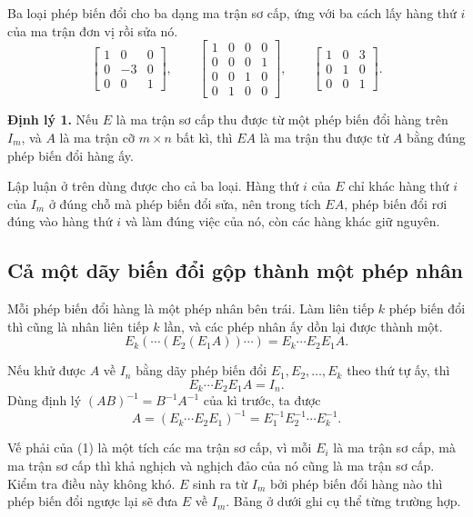 \documentclass[12pt,a4paper]{article}
\begin{document}
Ba loại phép biến đổi cho ba dạng ma trận sơ cấp, ứng với ba cách lấy hàng thứ \(i\) của ma trận đơn vị rồi sửa nó.
$$
\left[ \begin{array}{rrr} 1 & 0 & 0\\ 0 & -3 & 0\\ 0 & 0 & 1 \end{array} \right],\qquad
\left[ \begin{array}{rrrr} 1 & 0 & 0 & 0\\ 0 & 0 & 0 & 1\\ 0 & 0 & 1 & 0\\ 0 & 1 & 0 & 0 \end{array} \right],\qquad
\left[ \begin{array}{rrr} 1 & 0 & 3\\ 0 & 1 & 0\\ 0 & 0 & 1 \end{array} \right].
$$

\textbf{Định lý 1.} Nếu \(E\) là ma trận sơ cấp thu được từ một phép biến đổi hàng trên \(I_m\), và \(A\) là ma trận cỡ \(m\times n\) bất kì, thì \(EA\) là ma trận thu được từ \(A\) bằng đúng phép biến đổi hàng ấy.

Lập luận ở trên dùng được cho cả ba loại. Hàng thứ \(i\) của \(E\) chỉ khác hàng thứ \(i\) của \(I_m\) ở đúng chỗ mà phép biến đổi sửa, nên trong tích \(EA\), phép biến đổi rơi đúng vào hàng thứ \(i\) và làm đúng việc của nó, còn các hàng khác giữ nguyên.

\subsection{Cả một dãy biến đổi gộp thành một phép nhân}

Mỗi phép biến đổi hàng là một phép nhân bên trái. Làm liên tiếp \(k\) phép biến đổi thì cũng là nhân liên tiếp \(k\) lần, và các phép nhân ấy dồn lại được thành một.
$$
E_k\left(\cdots\left(E_2\left(E_1A\right)\right)\cdots\right)=E_k\cdots E_2E_1A.
$$

Nếu khử được \(A\) về \(I_n\) bằng dãy phép biến đổi \(E_1,E_2,\ldots,E_k\) theo thứ tự ấy, thì
$$
E_k\cdots E_2E_1A=I_n.
$$
Dùng định lý \((AB)^{-1}=B^{-1}A^{-1}\) của kì trước, ta được
$$
A=\left(E_k\cdots E_2E_1\right)^{-1}=E_1^{-1}E_2^{-1}\cdots E_k^{-1}. \tag{1}
$$

Vế phải của (1) là một tích các ma trận sơ cấp, vì mỗi \(E_i\) là ma trận sơ cấp, mà ma trận sơ cấp thì khả nghịch và nghịch đảo của nó cũng là ma trận sơ cấp. Kiểm tra điều này không khó. \(E\) sinh ra từ \(I_m\) bởi phép biến đổi hàng nào thì phép biến đổi ngược lại sẽ đưa \(E\) về \(I_m\). Bảng ở dưới ghi cụ thể từng trường hợp.
\end{document}
